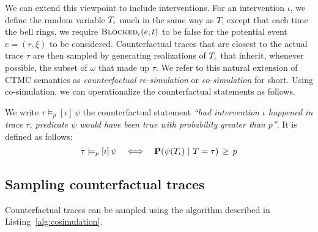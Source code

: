 We can extend this viewpoint to include interventions. For an
intervention $\iota$, we define the random variable ${T_\iota}{}$ much in
the same way as $T$, except that each time the bell rings, we require
${\textsc{Blocked}}_{\iota}(e, t)$ to be false for the potential event
$e=(r, \xi)$ to be considered.  Counterfactual traces that are closest
to the actual trace $\tau$ are then sampled by generating realizations
of ${T_\iota}{}$ that inherit, whenever possible, the subset of $\omega$
that made up $\tau$. 
We refer to this natural extension of CTMC semantics as
\textit{counterfactual re-simulation} or \textit{co-simulation} for
short. Using co-simulation, we can operationalize the counterfactual
statements as follows.

\begin{definition} We write
  $\tau \models_p [\iota] \, \psi$ the counterfactual statement
  \textit{``had intervention $\iota$ happened in trace $\tau$,
    predicate $\psi$ would have been true with probability greater
    than $p$''}.  It is defined as follows:
  \[ \tau \models_p [\iota] \, \psi \quad \Longleftrightarrow \quad
    \mathbf{P}( \psi({T_\iota}{}) \ |\ T = \tau) \,\geq\, p \]
\end{definition}

\subsection{Sampling counterfactual traces}

Counterfactual traces can be sampled using the algorithm described in
Listing~\ref{alg:cosimulation}.


